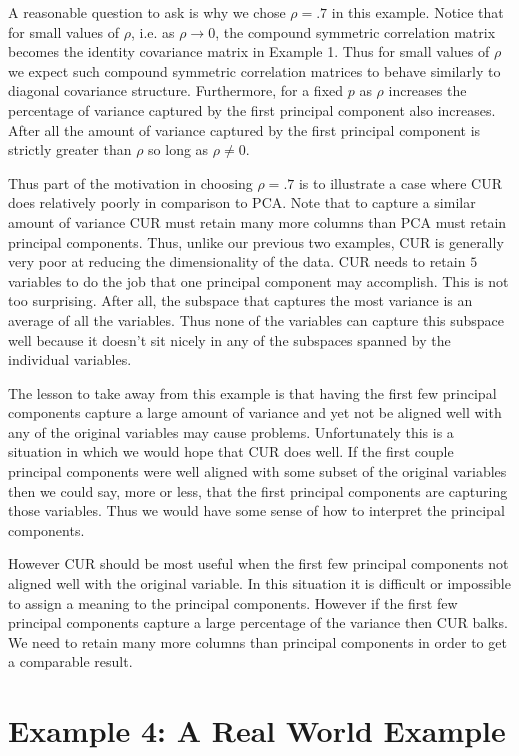 \documentclass{book}
\begin{document}
A reasonable question to ask is why we chose $\rho=.7$ in this example. Notice that for small values of $\rho$, i.e. as $\rho\rightarrow 0$, the compound symmetric correlation matrix becomes the identity covariance matrix in Example 1. Thus for small values of $\rho$ we expect such compound symmetric correlation matrices to behave similarly to diagonal covariance structure. Furthermore, for a fixed $p$ as $\rho$ increases the percentage of variance captured by the first principal component also increases. After all the amount of variance captured by the first principal component is strictly greater than $\rho$ so long as $\rho \neq 0$.

Thus part of the motivation in choosing $\rho=.7$ is to illustrate a case where CUR does relatively poorly in comparison to PCA. Note that to capture a similar amount of variance CUR must retain many more columns than PCA must retain principal components. Thus, unlike our previous two examples, CUR is generally very poor at reducing the dimensionality of the data. CUR needs to retain $5$ variables to do the job that one principal component may accomplish. This is not too surprising. After all, the subspace that captures the most variance is an average of all the variables. Thus none of the variables can capture this subspace well because it doesn't sit nicely in any of the subspaces spanned by the individual variables. 

The lesson to take away from this example is that having the first few principal components capture a large amount of variance and yet not be aligned well with any of the original variables may cause problems. Unfortunately this is a situation in which we would hope that CUR does well. If the first couple principal components were well aligned with some subset of the original variables then we could say, more or less, that the first principal components are capturing those variables. Thus we would have some sense of how to interpret the principal components.

However CUR should be most useful when the first few principal components not aligned well with the original variable. In this situation it is difficult or impossible to assign a meaning to the principal components. However if the first few principal components capture a large percentage of the variance then CUR balks. We need to retain many more columns than principal components in order to get a comparable result. 


\newpage
\section{Example 4: A Real World Example}
\end{document}
